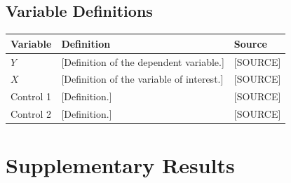 %
\begin{appendices}


\begin{singlespace}
\chapter{Variable Definitions}\label{app:variables}
\end{singlespace}

\begin{table}[htbp]
    \centering
    \begin{tabular}{p{3cm}p{7cm}p{3cm}}
        \toprule
        Variable & Definition & Source \\
        \midrule
        $Y$       & [Definition of the dependent variable.]      & [SOURCE] \\
        $X$       & [Definition of the variable of interest.]    & [SOURCE] \\
        Control 1 & [Definition.]                                & [SOURCE] \\
        Control 2 & [Definition.]                                & [SOURCE] \\
        \bottomrule
    \end{tabular}
\end{table}

\chapter{Supplementary Results}\label{app:supplementary}
\lipsum[1]

\end{appendices}
